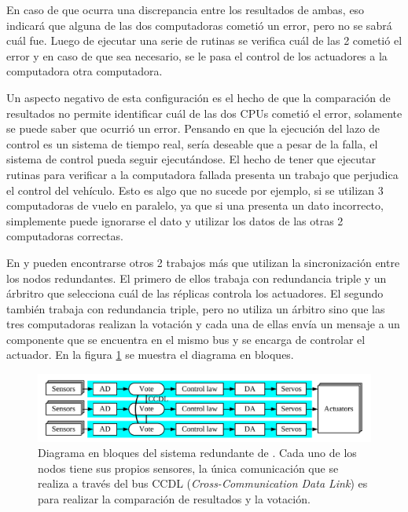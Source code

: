 En caso de que ocurra una discrepancia entre los resultados de ambas, eso indicará que alguna de las dos computadoras cometió un error, pero no se sabrá cuál fue. Luego de ejecutar una serie de rutinas se verifica cuál de las 2 cometió el error y en caso de que sea necesario, se le pasa el control de los actuadores a la computadora otra computadora.

Un aspecto negativo de esta configuración es el hecho de que la comparación de resultados no permite identificar cuál de las dos CPUs cometió el error, solamente se puede saber que ocurrió un error. Pensando en que la ejecución del lazo de control es un sistema de tiempo real, sería deseable que a pesar de la falla, el sistema de control pueda seguir ejecutándose. El hecho de tener que ejecutar rutinas para verificar a la computadora fallada presenta un trabajo que perjudica el control del vehículo. Esto es algo que no sucede por ejemplo, si se utilizan 3 computadoras de vuelo en paralelo, ya que si una presenta un dato incorrecto, simplemente puede ignorarse el dato y utilizar los datos de las otras 2 computadoras correctas. %

En \cite{chen2015design} y \cite{wang2008development} pueden encontrarse otros 2 trabajos más que utilizan la sincronización entre los nodos redundantes. El primero de ellos trabaja con redundancia triple y un árbritro que selecciona cuál de las réplicas controla los actuadores. El segundo también trabaja con redundancia triple, pero no utiliza un árbitro sino que las tres computadoras realizan la votación y cada una de ellas envía un mensaje a un componente que se encuentra en el mismo bus y se encarga de controlar el actuador. En la figura \ref{fig:RS_485_sync} se muestra el diagrama en bloques.

\begin{figure}[H]
    \centering
    \includegraphics[width=\textwidth]{img/RS_485_sync.png}
    \caption{Diagrama en bloques del sistema redundante de \cite{wang2008development}. Cada uno de los nodos tiene sus propios sensores, la única comunicación que se realiza a través del bus CCDL (\textit{Cross-Communication Data Link}) es para realizar la comparación de resultados y la votación.}
    \label{fig:RS_485_sync}
\end{figure}

